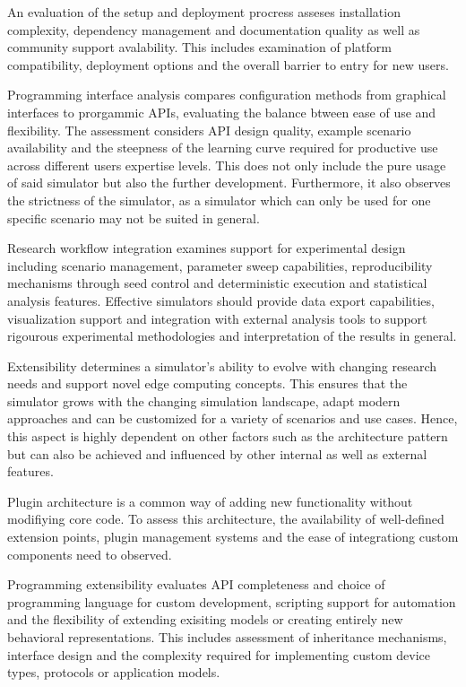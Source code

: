 An evaluation of the setup and deployment procress asseses installation complexity, dependency management and documentation quality as well as community support avalability.
This includes examination of platform compatibility, deployment options and the overall barrier to entry for new users.

Programming interface analysis compares configuration methods from graphical interfaces to prorgammic APIs, evaluating the balance btween ease of use and flexibility.
The assessment considers API design quality, example scenario availability and the steepness of the learning curve required for productive use across different users expertise levels.
This does not only include the pure usage of said simulator but also the further development.
Furthermore, it also observes the strictness of the simulator, as a simulator which can only be used for one specific scenario may not be suited in general.

Research workflow integration examines support for experimental design including scenario management, parameter sweep capabilities, reproducibility mechanisms through seed control and deterministic execution and statistical analysis features.
Effective simulators should provide data export capabilities, visualization support and integration with external analysis tools to support rigourous experimental methodologies and interpretation of the results in general.

Extensibility determines a simulator's ability to evolve with changing research needs and support novel edge computing concepts.
This ensures that the simulator grows with the changing simulation landscape, adapt modern approaches and can be customized for a variety of scenarios and use cases.
Hence, this aspect is highly dependent on other factors such as the architecture pattern but can also be achieved and influenced by other internal as well as external features.

Plugin architecture is a common way of adding new functionality without modifiying core code.
To assess this architecture, the availability of well-defined extension points, plugin management systems and the ease of integrationg custom components need to observed.

Programming extensibility evaluates API completeness and choice of programming language for custom development, scripting support for automation and the flexibility of extending exisiting models or creating entirely new behavioral representations.
This includes assessment of inheritance mechanisms, interface design and the complexity required for implementing custom device types, protocols or application models.

